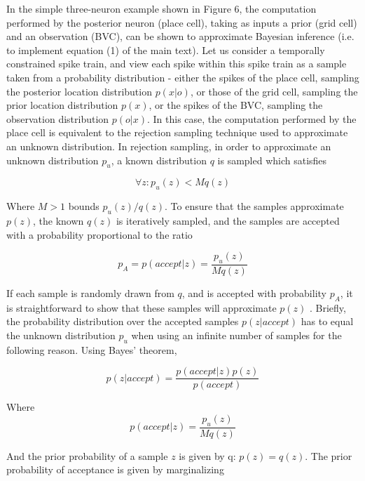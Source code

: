 In the simple three-neuron example shown in Figure 6, the computation performed by the posterior neuron (place cell), taking as inputs a prior (grid cell) and an observation (BVC), can be shown to approximate Bayesian inference (i.e. to implement equation (1) of the main text). Let us consider a temporally constrained spike train, and view each spike within this spike train as a sample taken from a probability distribution - either the spikes of the place cell, sampling the posterior location distribution $ p(x|o) $, or those of the grid cell, sampling the prior location distribution $ p(x) $, or the spikes of the BVC, sampling the observation distribution $ p(o|x) $.
In this case, the computation performed by the place cell is equivalent to the rejection sampling technique \citep{Liu1996, Bishop2006} used to approximate an unknown distribution. In rejection sampling, in order to approximate an unknown distribution $p_u$, a known distribution $q$ is sampled which satisfies 

\begin{equation}\label{RejSamp}
\forall z : p_u(z) < Mq(z)
\end{equation}

Where $M>1$ bounds $p_u(z)/q(z)$. To ensure that the samples approximate $p(z)$, the known $q(z)$ is iteratively sampled, and the samples are accepted with a probability proportional to the ratio 

\begin{equation}\label{AccProb}
p_A=p(accept|z)=\frac{p_u(z)}{Mq(z)}
\end{equation}

If each sample is randomly drawn from $q$, and is accepted with probability $p_A$, it is straightforward to show that these samples will approximate $p(z)$ \citep{Liu1996, Bishop2006}. Briefly, the probability distribution over the accepted samples $ p(z|accept) $ has to equal the unknown distribution $p_u$ when using an infinite number of samples for the following reason. Using Bayes' theorem,

\begin{equation}\label{RSProof1}
p(z|accept)=\frac{p(accept|z) p(z)}{p(accept)} 
\end{equation}

Where
\begin{equation}\label{RSProof2}
p(accept|z)=\frac{p_u(z)}{Mq(z)}
\end{equation}

And the prior probability of a sample $z$ is given by q: $p(z)=q(z)$. The prior probability of acceptance is given by marginalizing

